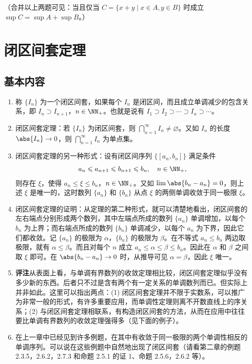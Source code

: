 （合并以上两题可见：当且仅当 $C=\{x+y\mid x\in A,y\in B\}$ 时成立 $\sup C=\sup A+\sup B$。）

\section{闭区间套定理}

\subsection{基本内容}

\begin{enumerate}
  \item 称 $\{I_n\}$ 为一个闭区间套，如果每个 $I_n$ 是闭区间，而且成立单调减少的包含关系，即 $I_n\supset I_{n+1}$，$n\in\NN_+$。也就是说有 $I_1\supset I_2\supset\cdots\supset I_n\supset\cdots$。
  \item 闭区间套定理：若 $\{I_n\}$ 为闭区间套，则 $\bigcap_{n=1}^{\infty}I_n\neq\varnothing$。又如 $I_n$ 的长度 $\abs{I_n}\to0$，则 $\bigcap_{n=1}^{\infty}I_n$ 为单点集。
  \item 闭区间套定理的另一种形式：设有闭区间序列 $\{[a_n,b_n]\}$ 满足条件
  \[
    a_n\leqslant a_{n+1}\leqslant b_{n+1}\leqslant b_n,\quad n\in\NN_+,
  \]
  则存在 $\xi$，使得 $a_n\leqslant\xi\leqslant b_n$，$n\in\NN_+$。又如 $\lim\abs{b_n-a_n}=0$，则上述 $\xi$ 是唯一的，这时数列 $\{a_n\}$ 和 $\{b_n\}$ 从点 $\xi$ 的两侧单调收敛于同一极限 $\xi$。
  \item 闭区间套定理的证明：从定理的第二种形式，就可以清楚地看出，闭区间套的左右端点分别形成两个数列，其中左端点所成的数列 $\{a_n\}$ 单调增加，以每个 $b_n$ 为上界；而右端点所成的数列 $\{b_n\}$ 单调减少，以每个 $a_n$ 为下界，因此它们都收敛。记 $\{a_n\}$ 的极限为 $\alpha$，$\{b_n\}$ 的极限为 $\beta$。在不等式 $a_n\leqslant b_n$ 两边取极限，就有 $\alpha\leqslant\beta$。而且对每个 $n$ 成立 $a_n\leqslant\alpha\leqslant\beta\leqslant b_n$。因此在 $\alpha$ 和 $\beta$ 之间取 $\xi$ 即可。在 $\abs{b_n-a_n}\to0$ 时，从推导可见 $\alpha=\beta$，因此 $\xi$ 唯一。
  \item \textbf{评注}\quad 从表面上看，与单调有界数列的收敛定理相比较，闭区间套定理似乎没有多少新的东西。后者只不过是含有两个有一定关系的单调数列而已。但实际上并非如此。这里可以指出两点：(1) 闭区间套定理并不限于实数系，可以推广为非常一般的形式，有许多重要应用，而单调性定理则离不开数直线上的序关系；(2) 与闭区间套定理相联系，有构造闭区间套的方法，从而在应用中往往要比单调有界数列的收敛定理强得多（见下面的例子）。
  \item 在上一章中已经见到许多例题，在其中有收敛于同一极限的两个单调性相反的单调序列。可以说在这些例题中自然地出现了闭区间套（请看第二章的例题 2.3.5，2.6.2，2.7.3 和命题 2.5.1 的证 1、命题 2.5.6，2.6.2 等）。
\end{enumerate}

